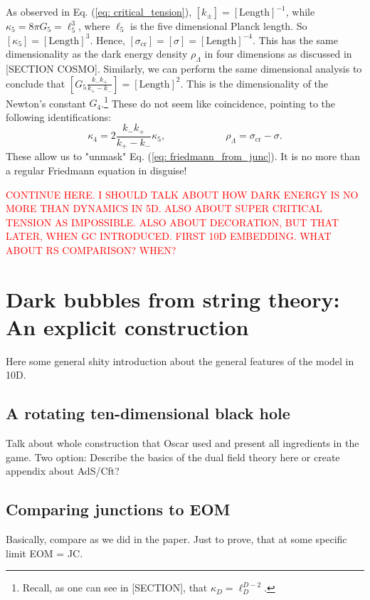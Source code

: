 \documentclass[12pt, a4paper]{article} %
\begin{document}
As observed in Eq. (\ref{eq: critical_tension}), $[k_{\pm}] = [\text{Length}]^{-1}$, while $\kappa_{5} = 8 \pi G_{5} = \ell_{5}^{3}$, where $\ell_{5}$ is the five dimensional Planck length. So $[\kappa_{5}] = [\text{Length}]^{3}$. Hence, $[\sigma_{\text{cr}}] = [\sigma] = [\text{Length}]^{-4}$. This has the same dimensionality as the dark energy density $\rho_{\Lambda}$ in four dimensions as discussed in [SECTION COSMO]. Similarly, we can perform the same dimensional analysis to conclude that $\left[G_{5} \tfrac{k_{-}k_{+}}{k_{+} - k_{-}}\right] = [\text{Length}]^{2}$. This is the dimensionality of the Newton's constant $G_{4}$.\footnote{Recall, as one can see in [SECTION], that $\kappa_{D} = \ell^{D-2}_{D}$.} These do not seem like coincidence, pointing to the following identifications:
\begin{equation}\label{eq: identifications_dark_energy}
	\kappa_{4} = 2 \frac{k_{-}k_{+}}{k_{+} - k_{-}} \kappa_{5}, \qquad \qquad \qquad \rho_{\Lambda} = \sigma_{\text{cr}} - \sigma.
\end{equation}
These allow us to "unmask" Eq. (\ref{eq: friedmann_from_junc}). It is no more than a regular Friedmann equation in disguise!

\textcolor{red}{CONTINUE HERE. I SHOULD TALK ABOUT HOW DARK ENERGY IS NO MORE THAN DYNAMICS IN 5D. ALSO ABOUT SUPER CRITICAL TENSION AS IMPOSSIBLE. ALSO ABOUT DECORATION, BUT THAT LATER, WHEN GC INTRODUCED. FIRST 10D EMBEDDING. WHAT ABOUT RS COMPARISON? WHEN?}





\section{Dark bubbles from string theory: An explicit construction}
Here some general shity introduction about the general features of the model in 10D.
\subsection{A rotating ten-dimensional black hole}
Talk about whole construction that Oscar used and present all ingredients in the game. Two option: Describe the basics of the dual field theory here or create appendix about AdS/Cft?
\subsection{Comparing junctions to EOM}
Basically, compare as we did in the paper. Just to prove, that at some specific limit EOM = JC. 
\end{document}
